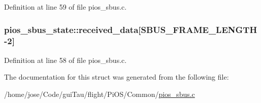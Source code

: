 Definition at line 59 of file pios\-\_\-sbus.\-c.

\hypertarget{structpios__sbus__state_a83bb02cd783bb2f8d8aabf3b94e9324b}{
\subsubsection[{received\-\_\-data}]{ pios\-\_\-sbus\-\_\-state\-::received\-\_\-data\mbox{[}S\-B\-U\-S\-\_\-\-F\-R\-A\-M\-E\-\_\-\-L\-E\-N\-G\-T\-H-\/2\mbox{]}}}\label{structpios__sbus__state_a83bb02cd783bb2f8d8aabf3b94e9324b}


Definition at line 58 of file pios\-\_\-sbus.\-c.



The documentation for this struct was generated from the following file\-:\begin{DoxyCompactItemize}
\item 
/home/jose/\-Code/gui\-Tau/flight/\-Pi\-O\-S/\-Common/\hyperlink{pios__sbus_8c}{pios\-\_\-sbus.\-c}\end{DoxyCompactItemize}
